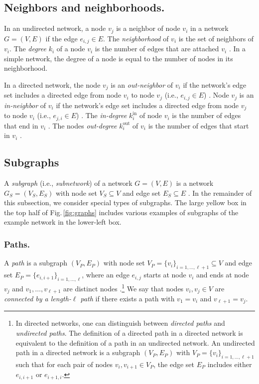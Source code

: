 \documentclass{comnet-mod}
\begin{document}
\subsection{Neighbors and neighborhoods.}\label{sec:rev:neighbors}

In an undirected network, a node $v_j$ is a \textrm{neighbor} of node $v_i$ in a network $G=(V,E)$ if the edge $e_{i,j}\in E$. The \textit{neighborhood} of $v_i$ is the set of neighbors of $v_i$. The \textit{degree} $k_i$ of a node $v_i$ is the number of edges that are attached $v_i$ \cite[p.\,9]{Newman2018}. In a simple network, the degree of a node is equal to the number of nodes in its neighborhood.

In a directed network, the node $v_j$ is an \textit{out-neighbor} of $v_i$ if the network's edge set includes a directed edge from node $v_i$ to node $v_j$ (i.e., $e_{i,j}\in E$) \cite[p.\,58]{VanSteen2010}. Node $v_j$ is an \textit{in-neighbor} of $v_i$ if the network's edge set includes a directed edge from node $v_j$ to node $v_i$ (i.e., $e_{j,i}\in E$) \cite[p.\,58]{VanSteen2010}. 
The \textit{in-degree} $k_i^{\textrm{in}}$ of node $v_i$ is the number of edges that end in $v_i$ \cite[p.\,130]{Newman2018}. The nodes \textit{out-degree} $k_i^{\textrm{out}}$ of $v_i$ is the number of edges that start in $v_i$ \cite[p.\,130]{Newman2018}. 


\subsection{Subgraphs}\label{sec:rev:subnetworks}

A \textit{subgraph} (i.e., \textit{subnetwork}) of a network $G=(V,E)$ is a network $G_S=(V_S,E_S)$ with node set $V_S \subseteq V$ and edge set $E_S\subseteq E$ \cite{Bollobas2013}. In the remainder of this subsection, we consider special types of subgraphs. The large yellow box in the top half of Fig.\,\ref{fig:graphs} includes various examples of subgraphs of the example network in the lower-left box.


\subsubsection{Paths.}\label{sec:paths}

A \textit{path} is a subgraph $(V_P,E_P)$ with node set $V_P=\{v_i\}_{i=1,\ldots,{\ell+1}}\subseteq V$ and edge set $E_P=\{e_{i,i+1}\}_{i=1,\ldots,\ell}$, where an edge $e_{i,j}$ starts at node $v_i$ and ends at node $v_j$ and $v_{1},\ldots,v_{{\ell+1}}$ are distinct nodes \cite[p.\,4]{Bollobas2013}.\footnote{In directed networks, one can distinguish between \textit{directed paths} and \textit{undirected paths}. The definition of a directed path in a directed network is equivalent to the definition of a path in an undirected network. An undirected path in a directed network is a subgraph $(V_P,E_P)$ with $V_P=\{v_i\}_{i=1,\ldots,{\ell+1}}$ such that for each pair of nodes $v_i,v_{i+1} \in V_P$, the edge set $E_P$ includes either $e_{i,i+1}$ or $e_{i+1,i}$.} We say that nodes $v_i,v_j\in V$ are \textit{connected by a length-$\ell$ path} if there exists a path with $v_1 = v_{i}$ and $v_{{\ell+1}} = v_j$. 
\end{document}

